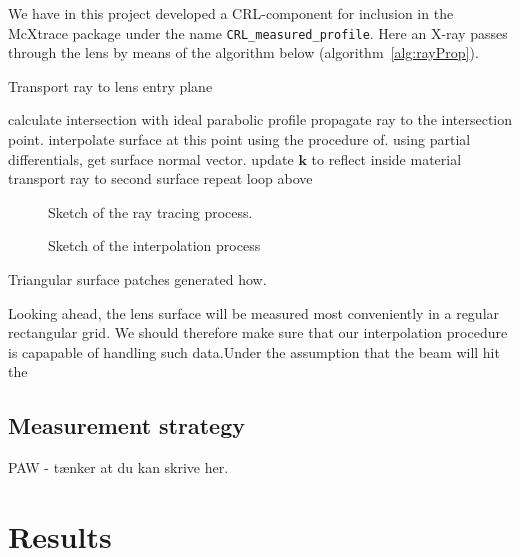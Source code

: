 \documentclass[preprint]{iucr}              %
\begin{document}
We have in this project developed a CRL-component for inclusion in the McXtrace package under the name \texttt{CRL\_measured\_profile}. Here an X-ray passes through the lens by means of the algorithm below (algorithm~\ref{alg:rayProp}).\\

\newcommand\mycommfont[1]{\footnotesize\ttfamily\textcolor{blue}{#1}}

\begin{algorithm}[H]
\label{alg:rayProp}
  Transport ray to lens entry plane\;
  {
    calculate intersection with ideal parabolic profile\;
    propagate ray to the intersection point.\;
    interpolate surface at this point using the procedure of\cite{Nagata2005}.\;
    using partial differentials, get surface normal vector.\;
    update $\mathbf{k}$ to reflect inside material\;
    transport ray to second surface\;
    repeat loop above\;
    
  }
\end{algorithm}
\begin{figure}
    \centering
    \caption{Sketch of the ray tracing process.}
    \label{fig:ray_trace_sketch}
\end{figure}

\begin{figure}
    \centering
    \caption{Sketch of the interpolation process}
    \label{fig:interpol_sketch}
\end{figure}

Triangular surface patches generated how.

Looking ahead, the lens surface will be measured most conveniently in a regular rectangular grid. We should therefore make sure that our interpolation procedure is capapable of handling such data.Under the assumption that the beam will hit the   


\subsection{Measurement strategy}
PAW - tænker at du kan skrive her.


\section{Results}
\end{document}

